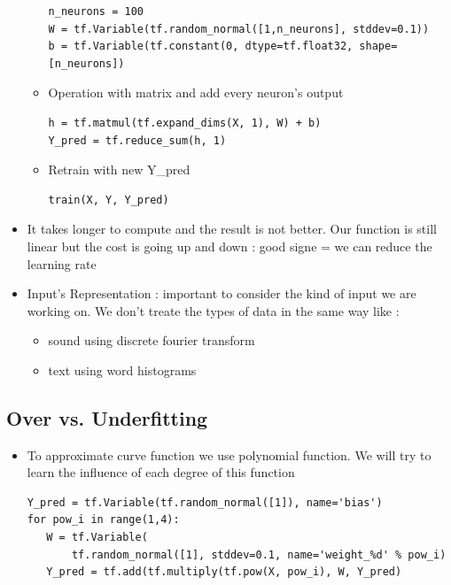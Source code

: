 \documentclass[12pt,a4paper]{article}
\begin{document}
\begin{itemize}
\begin{itemize}
\begin{lstlisting}
n_neurons = 100
W = tf.Variable(tf.random_normal([1,n_neurons], stddev=0.1))
b = tf.Variable(tf.constant(0, dtype=tf.float32, shape=[n_neurons])
\end{lstlisting}
\item Operation with matrix and add every neuron's output
\begin{lstlisting}
h = tf.matmul(tf.expand_dims(X, 1), W) + b)
Y_pred = tf.reduce_sum(h, 1)
\end{lstlisting}
\item Retrain with new Y\_pred
\begin{lstlisting}
train(X, Y, Y_pred)
\end{lstlisting}
\end{itemize}
\item It takes longer to compute and the result is not better. Our function is still linear but the cost is going up and down : good signe = we can reduce the learning rate
\item Input's Representation : important to consider the kind of input we are working on. We don't treate the types of data in the same way like :
\begin{itemize}
\item sound using discrete fourier transform
\item text using word histograms
\end{itemize}
\end{itemize}
\subsection{Over vs. Underfitting}
\begin{itemize}
\item To approximate curve function we use polynomial function. We will try to learn the influence of each degree of this function
\begin{lstlisting}
Y_pred = tf.Variable(tf.random_normal([1]), name='bias')
for pow_i in range(1,4):
   W = tf.Variable(
       tf.random_normal([1], stddev=0.1, name='weight_%d' % pow_i)
   Y_pred = tf.add(tf.multiply(tf.pow(X, pow_i), W, Y_pred)
\end{lstlisting}
\end{itemize}
\end{document}

